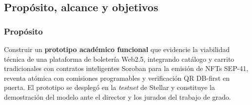 \documentclass[12pt,oneside]{report}
\begin{document}
    \subsection{Propósito, alcance y objetivos}
    \label{subsec:proposito-alcance}

      \subsubsection*{Propósito}
      Construir un \textbf{prototipo académico funcional} que evidencie la viabilidad técnica de una plataforma de boletería Web2.5, integrando catálogo y carrito tradicionales con contratos inteligentes Soroban para la emisión de NFTs SEP-41, reventa atómica con comisiones programables y verificación QR DB-first en puerta. El prototipo se desplegó en la \textit{testnet} de Stellar y constituye la demostración del modelo ante el director y los jurados del trabajo de grado.
\end{document}

